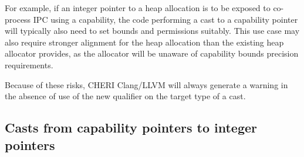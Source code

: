 \documentclass[12pt,twoside,openright,a4paper]{article}
\newcommand{\ccode}[1]{{\small\ttfamily{#1}}}
\newcommand{\note}[2]{{\color{blue}[ Note: #1 - #2]}}
\renewcommand{\note}[2]{\relax\ifhmode\unskip\fi}
\newcommand{\bdnote}[1]{\note{#1}{Brooks D.}}
\newcommand{\rwnote}[1]{\note{#1}{Robert W.}}
\newcommand{\psnote}[1]{\note{#1}{Peter S.}}
\newcommand{\nwfnote}[1]{\note{#1}{nwf}}
\newcommand{\jhbnote}[1]{\note{#1}{John B.}}
\begin{document}
For example, if an integer pointer to a heap allocation is to be exposed to
co-process IPC using a capability, the code performing a cast to a capability
pointer will typically also need to set bounds and permissions suitably.
This use case may also require stronger alignment for the heap allocation than
the existing heap allocator provides, as the allocator will be unaware of
capability bounds precision requirements.
\psnote{give example code showing how this setting of bounds and permissions can be done?}

Because of these risks, CHERI Clang/LLVM will always generate a warning in
the absence of use of the new \ccode{\_\_cheri\_addr} qualifier on the target
type of a cast.
\bdnote{I think this is supposed to be \ccode{\_\_cheri\_tocap}. \ccode{\_\_cheri\_addr} is for capability to non-pointer integrer cases.}

\psnote{introducing \ccode{\_\_cheri\_addr} in passing -- better to be more explicit?}

\rwnote{Give examples of warnings?}

\nwfnote{Recommend \ccode{cheri\_address\_set}?}

\bdnote{We rarely use \_\_cheri\_tocap and instead use macros like \ccode{\_\_USER\_CAP} that perform some validation.  In the case of \ccode{\_\_USER\_CAP} we have a \ccode{\_\_USER\_CFROMPTR} that derives
from the process's DDC and (critically) ensures that sentinel values near (signed) zero are NULL-derived. We probably need to mention this here
or above when we talk about syscall arguments.}

\jhbnote{I think the takeaway about \ccode{\_\_USER\_CAP} is that it
  is not using language features (i.e. casts as being described here),
  but instead is a separate DSL built on top of C for use in the
  kernel.  I do think it is very much worth calling out that in the
  kernel, using DDC to derive caps for user addresses is almost always
  wrong, and that you want to be using the user's DDC explicitly
  instead.  For the purposes of this section about casts, simply
  talking about \ccode{\_\_cheri\_tocap} is ok.  However, we are missing an
  entire subsection here for ``Casts from capability to integer address``
  which needs to talk about \ccode{\_\_cheri\_addr}.}
 
\subsection{Casts from capability pointers to integer pointers}
\end{document}
